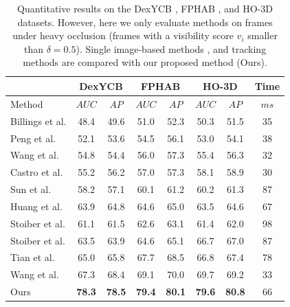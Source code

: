 \begin{table}[h]
\caption{Quantitative results on the DexYCB \cite{chao2021dexycb}, FPHAB \cite{garcia2018first}, and HO-3D \cite{hampali2020honnotate} datasets. However, here we only evaluate methods on frames under heavy occlusion (frames with a visibility score \( v_i \) smaller than \( \delta = 0.5 \)). Single image-based methods \cite{billings2019silhonet, peng2019pvnet, wang2021gdr, castro2023crt}, and tracking methods \cite{sun2021robust, huang2021pixel, he2021ffb6d, stoiber2020sparse, stoiber2022srt3d, tian2022large, wang2023deep} are compared with our proposed method (Ours).}
\label{tab:occlusion_ex}
\begin{center}
\begin{tabular}{l c c c c c c c} 
\hline
& \multicolumn{2}{c}{DexYCB } & \multicolumn{2}{c}{FPHAB } & \multicolumn{2}{c}{HO-3D} & Time \\
\hline
Method & $AUC$ & $AP$ & $AUC$ & $AP$ & $AUC$ & $AP$ & $ms$ \\  
\hline 
Billings et al. \cite{billings2019silhonet} & 48.4 & 49.6 & 51.0 & 52.3 & 50.3 & 51.5 & 35 \\

Peng et al. \cite{peng2019pvnet} & 52.1 & 53.6 & 54.5 & 56.1 & 53.0 & 54.1 & 38 \\

Wang et al. \cite{wang2021gdr} & 54.8 & 54.4 & 56.0 & 57.3 & 55.4 & 56.3 & 32 \\

Castro et al. \cite{castro2023crt} & 55.2 & 56.2 & 57.0 & 57.3 & 58.1 & 58.9 & 30 \\

\hline 

Sun et al. \cite{sun2021robust} & 58.2 & 57.1 & 60.1 & 61.2 & 60.2 & 61.3 & 87 \\

Huang et al. \cite{huang2021pixel} & 63.9 & 64.8 & 64.6 & 65.0 & 63.5 & 64.6 & 67 \\

Stoiber et al.\cite{stoiber2020sparse} & 61.1 & 61.5 & 62.6 & 63.1 & 61.4 & 62.0 & 98 \\

Stoiber et al. \cite{stoiber2022srt3d} & 63.5 & 63.9 & 64.6 & 65.1 & 66.7 & 67.0 & 87 \\

Tian et al. \cite{tian2022large} & 65.0 & 65.8 & 67.7 & 68.5 & 66.8 & 67.4 & 78 \\

Wang et al. \cite{wang2023deep} & 67.3 & 68.4 & 69.1 & 70.0 & 69.7 & 69.2 & 33 \\

Ours & \textbf{78.3} & \textbf{78.5} & \textbf{79.4} & \textbf{80.1} & \textbf{79.6} & \textbf{80.8} & 66 \\
\hline
\end{tabular}
\end{center}
\end{table}

